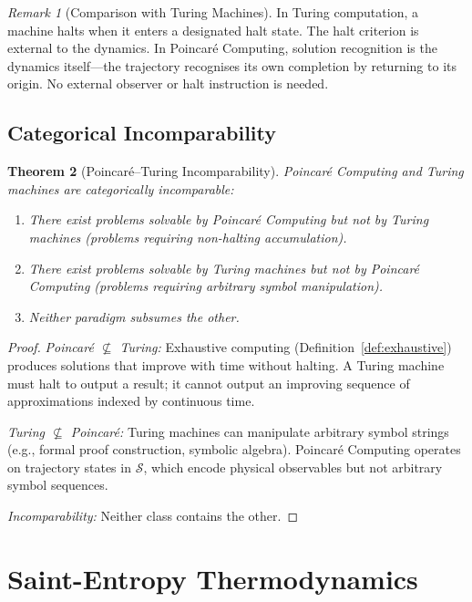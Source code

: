 \documentclass[twocolumn,10pt,a4paper]{article}
\theoremstyle{plain}
\newtheorem{theorem}{Theorem}[section]
\theoremstyle{definition}
\theoremstyle{remark}
\newtheorem{remark}[theorem]{Remark}
\newcommand{\Sspace}{\mathcal{S}}
\begin{document}
\begin{remark}[Comparison with Turing Machines]
In Turing computation, a machine halts when it enters a designated halt state. The halt criterion is external to the dynamics. In Poincar\'{e} Computing, solution recognition is the dynamics itself---the trajectory recognises its own completion by returning to its origin. No external observer or halt instruction is needed.
\end{remark}

\subsection{Categorical Incomparability}

\begin{theorem}[Poincar\'{e}--Turing Incomparability]
\label{thm:incomparability}
Poincar\'{e} Computing and Turing machines are categorically incomparable:
\begin{enumerate}
    \item There exist problems solvable by Poincar\'{e} Computing but not by Turing machines (problems requiring non-halting accumulation).
    \item There exist problems solvable by Turing machines but not by Poincar\'{e} Computing (problems requiring arbitrary symbol manipulation).
    \item Neither paradigm subsumes the other.
\end{enumerate}
\end{theorem}

\begin{proof}
\emph{Poincar\'{e} $\not\subseteq$ Turing:} Exhaustive computing (Definition~\ref{def:exhaustive}) produces solutions that improve with time without halting. A Turing machine must halt to output a result; it cannot output an improving sequence of approximations indexed by continuous time.

\emph{Turing $\not\subseteq$ Poincar\'{e}:} Turing machines can manipulate arbitrary symbol strings (e.g., formal proof construction, symbolic algebra). Poincar\'{e} Computing operates on trajectory states in $\Sspace$, which encode physical observables but not arbitrary symbol sequences.

\emph{Incomparability:} Neither class contains the other.
\end{proof}

\section{Saint-Entropy Thermodynamics}
\label{sec:saint_entropy}
\end{document}
